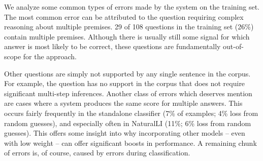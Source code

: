 %
%



%
%

We analyze some common types of errors made by the system on the training set.
The most common error can be attributed to the question requiring complex reasoning
  about multiple premises.
\num{29} of \num{108} questions in the training set (26\%) contain multiple
  premises.
Although there is usually still some signal for which answer is most likely to be correct,
  these questions are fundamentally out-of-scope for the approach.

Other questions are simply not supported by any single sentence in the corpus.
For example, the question  has
  no support in the corpus that does not require significant multi-step inferences.
Another class of errors which deserves mention are cases where a system produces
  the same score for multiple answers.
This occurs fairly frequently in the standalone classifier 
  (7\% of examples; 4\% loss from random guesses),
  and especially often in NaturalLI (11\%; 6\% loss from random guesses).
This offers some insight into why incorporating other models -- even with
  low weight -- can offer significant boosts in performance.
A remaining chunk of errors is, of course, caused by errors during classification.

